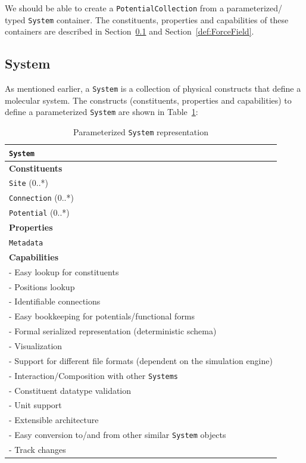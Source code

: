 \documentclass[12pt]{article}
\begin{document}
We should be able to create a \texttt{PotentialCollection} from a parameterized/ typed \texttt{System} container. The constituents, properties and capabilities of these containers are described in Section~\ref{def:Topology} and Section~\ref{def:ForceField}.

\subsection{System}
\label{def:Topology}
As mentioned earlier, a \texttt{System} is a collection of physical constructs that define a molecular system. The constructs (constituents, properties and capabilities) to define a parameterized \texttt{System} are shown in  Table~\ref{tab:TopologySpec}:

\begin{table}[ht]
    \centering
     \caption{Parameterized \texttt{System} representation}
    \begin{tabular}{|l|}
         \hline
         \rowcolor{gray!50}
        \texttt{System}  \\
         \hline
         \textbf{Constituents} \\
         \texttt{Site} (0..*) \\
         \texttt{Connection} (0..*)\\
         \texttt{Potential} (0..*)\\
         \hline
         \textbf{Properties}\\
         \texttt{Metadata} \\
         \hline
         \textbf{Capabilities}\\
         \hline
         - Easy lookup for constituents \\
         - Positions lookup \\
         - Identifiable connections \\
         - Easy bookkeeping for potentials/functional forms \\
         - Formal serialized representation (deterministic schema) \\
         - Visualization \\
         - Support for different file formats (dependent on the simulation engine) \\
         - Interaction/Composition with other \texttt{Systems}\\
         - Constituent datatype validation \\
         - Unit support \\
         - Extensible architecture \\
         - Easy conversion to/and from other similar \texttt{System} objects\\
         - Track changes \\

        \hline

    \end{tabular}
    \label{tab:TopologySpec}
\end{table}
\end{document}
